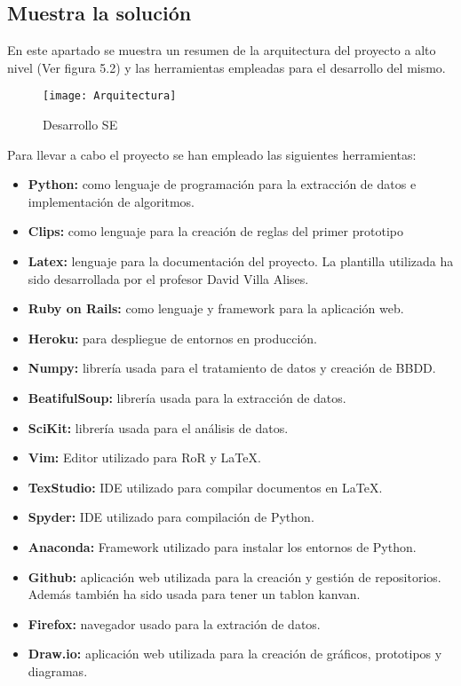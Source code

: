 \subsection{Muestra la solución}
En este apartado se muestra un resumen de la arquitectura del proyecto a alto nivel
(Ver figura 5.2) y las herramientas empleadas para el desarrollo del mismo.

\begin{figure}[htb]
  \centering
    \texttt{[image: Arquitectura]}
  \caption[Desarrollo SE]{Desarrollo SE}
  \label{fig:Desarrollo Sistema Experto}
\end{figure}


Para llevar a cabo el proyecto se han empleado las siguientes herramientas:
\begin{itemize}
  \item \textbf{Python:} como lenguaje de programación para la extracción de datos e implementación
    de algoritmos.
  \item \textbf{Clips:} como lenguaje para la creación de reglas del primer prototipo
  \item \textbf{Latex:} lenguaje para la documentación del proyecto. La plantilla utilizada
    ha sido desarrollada por el profesor David Villa Alises.
  \item \textbf{Ruby on Rails:} como lenguaje y framework para la aplicación web.
  \item \textbf{Heroku:} para despliegue de entornos en producción.
  \item \textbf{Numpy:} librería usada para el tratamiento de datos y creación de BBDD.
  \item \textbf{BeatifulSoup:} librería usada para la extracción de datos.
  \item \textbf{SciKit:} librería usada para el análisis de datos.
  \item \textbf{Vim:} Editor utilizado para RoR y LaTeX.
  \item \textbf{TexStudio:} IDE utilizado para compilar documentos en LaTeX.
  \item \textbf{Spyder:} IDE utilizado para compilación de Python.
  \item \textbf{Anaconda:} Framework utilizado para instalar los entornos de Python.
  \item \textbf{Github:} aplicación web utilizada para la creación y gestión de repositorios.
    Además también ha sido usada para tener un tablon kanvan.
  \item \textbf{Firefox:} navegador usado para la extración de datos.
  \item \textbf{Draw.io:} aplicación web utilizada para la creación de gráficos, prototipos
    y diagramas.
\end{itemize}

